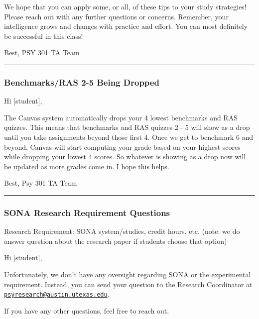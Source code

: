 \documentclass[
]{article}
\begin{document}
We hope that you can apply some, or all, of these tips to your study strategies! Please reach out with any further questions or concerns. Remember, your intelligence grows and changes with practice and effort. You can most definitely be successful in this class!

Best,
PSY 301 TA Team

\begin{center}\rule{0.5\linewidth}{0.5pt}\end{center}

\hypertarget{benchmarksras-2-5-being-dropped}{%
\subsubsection{Benchmarks/RAS 2-5 Being Dropped}\label{benchmarksras-2-5-being-dropped}}

Hi {[}student{]},

The Canvas system automatically drops your 4 lowest benchmarks and RAS quizzes. This means that benchmarks and RAS quizzes 2 - 5 will show as a drop until you take assignments beyond those first 4. Once we get to benchmark 6 and beyond, Canvas will start computing your grade based on your highest scores while dropping your lowest 4 scores. So whatever is showing as a drop now will be updated as more grades come in. I hope this helps.

Best,
Psy 301 TA Team

\begin{center}\rule{0.5\linewidth}{0.5pt}\end{center}

\hypertarget{sona-research-requirement-questions}{%
\subsubsection{SONA Research Requirement Questions}\label{sona-research-requirement-questions}}

Research Requirement: SONA system/studies, credit hours, etc. (note: we do answer question about the research paper if students choose that option)

Hi {[}student{]},

Unfortunately, we don't have any oversight regarding SONA or the experimental requirement. Instead, you can send your question to the Research Coordinator at \href{mailto:psyresearch@austin.utexas.edu}{\nolinkurl{psyresearch@austin.utexas.edu}}.

If you have any other questions, feel free to reach out.
\end{document}
